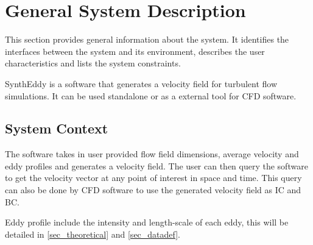 \documentclass[12pt]{article}
\begin{document}

\section{General System Description} \label{Sec_GSD}

This section provides general information about the system.  It identifies the
interfaces between the system and its environment, describes the user
characteristics and lists the system constraints.  

SynthEddy is a software that generates a velocity field for turbulent flow simulations. It can be used standalone or as a external tool for CFD software.


\subsection{System Context}

The software takes in user provided flow field dimensions, average velocity and eddy profiles and generates a velocity field. The user can then query the software to get the velocity vector at any point of interest in space and time. This query can also be done by CFD software to use the generated velocity field as IC and BC.

Eddy profile include the intensity and length-scale of each eddy, this will be detailed in \ref{sec_theoretical} and \ref{sec_datadef}.
\end{document}
